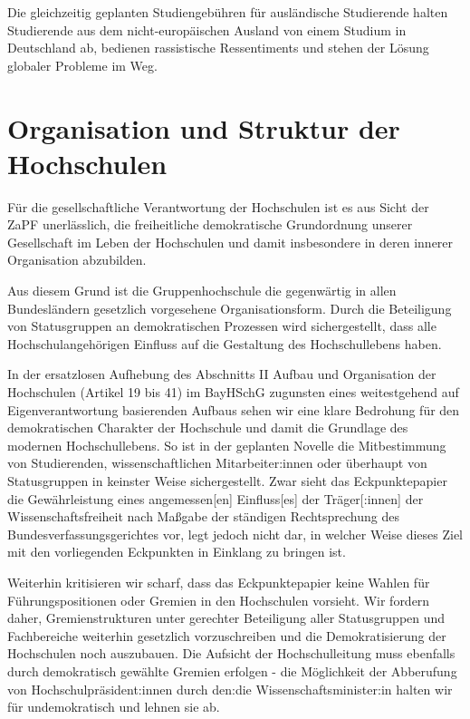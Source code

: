 \documentclass[a4paper]{scrartcl}
\begin{document}
Die gleichzeitig geplanten Studiengebühren für ausländische Studierende halten Studierende aus dem nicht-europäischen Ausland von einem Studium in Deutschland ab, bedienen rassistische Ressentiments und stehen der Lösung globaler Probleme im Weg.

\section{Organisation und Struktur der Hochschulen}

Für die gesellschaftliche Verantwortung der Hochschulen ist es aus Sicht der ZaPF unerlässlich, die freiheitliche demokratische Grundordnung unserer Gesellschaft im Leben der Hochschulen und damit insbesondere in deren innerer Organisation abzubilden.

Aus diesem Grund ist die Gruppenhochschule die gegenwärtig in allen Bundesländern gesetzlich vorgesehene Organisationsform. Durch die Beteiligung von Statusgruppen an demokratischen Prozessen wird sichergestellt, dass alle Hochschulangehörigen Einfluss auf die Gestaltung des Hochschullebens haben.

In der ersatzlosen Aufhebung des Abschnitts II \glqq Aufbau und Organisation der Hochschulen\grqq{} (Artikel 19 bis 41) im BayHSchG zugunsten eines weitestgehend auf Eigenverantwortung basierenden Aufbaus sehen wir eine klare Bedrohung für den demokratischen Charakter der Hochschule und damit die Grundlage des modernen Hochschullebens. So ist in der geplanten Novelle die Mitbestimmung von Studierenden, wissenschaftlichen Mitarbeiter:innen oder überhaupt von Statusgruppen in keinster Weise sichergestellt. Zwar sieht das Eckpunktepapier die Gewährleistung eines \glqq angemessen[en] Einfluss[es] der  Träger[:innen] der Wissenschaftsfreiheit\grqq{} nach Maßgabe der ständigen Rechtsprechung des Bundesverfassungsgerichtes vor, legt jedoch nicht dar, in welcher Weise dieses Ziel mit den vorliegenden Eckpunkten in Einklang zu bringen ist.

Weiterhin kritisieren wir scharf, dass das Eckpunktepapier keine Wahlen für Führungspositionen oder Gremien in den Hochschulen vorsieht. Wir fordern daher, Gremienstrukturen unter gerechter Beteiligung aller Statusgruppen und Fachbereiche weiterhin gesetzlich vorzuschreiben und die Demokratisierung der Hochschulen noch auszubauen. Die Aufsicht der Hochschulleitung muss ebenfalls durch demokratisch gewählte Gremien erfolgen - die Möglichkeit der Abberufung von Hochschulpräsident:innen durch den:die Wissenschaftsminister:in halten wir für undemokratisch und lehnen sie ab.
\end{document}

